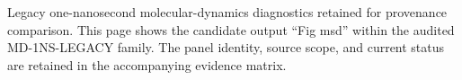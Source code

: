 Legacy one-nanosecond molecular-dynamics diagnostics retained for provenance comparison. This page shows the candidate output ``Fig msd'' within the audited MD-1NS-LEGACY family. The panel identity, source scope, and current status are retained in the accompanying evidence matrix.
